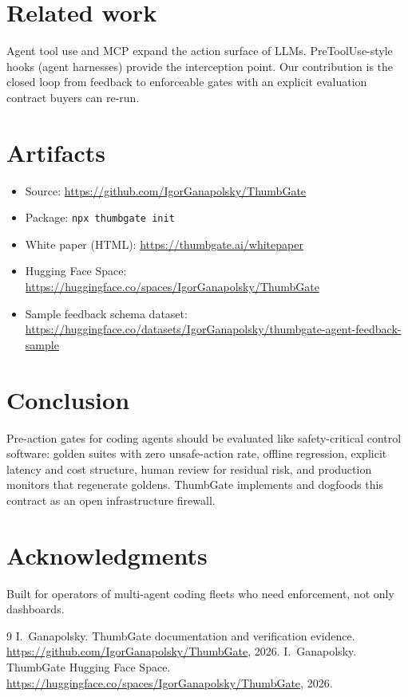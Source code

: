 \documentclass[11pt]{article}
\begin{document}
\section{Related work}
Agent tool use and MCP expand the action surface of LLMs. PreToolUse-style hooks (agent harnesses) provide the interception point. Our contribution is the closed loop from feedback to enforceable gates with an explicit evaluation contract buyers can re-run.

\section{Artifacts}
\begin{itemize}[leftmargin=*]
  \item Source: \url{https://github.com/IgorGanapolsky/ThumbGate}
  \item Package: \texttt{npx thumbgate init}
  \item White paper (HTML): \url{https://thumbgate.ai/whitepaper}
  \item Hugging Face Space: \url{https://huggingface.co/spaces/IgorGanapolsky/ThumbGate}
  \item Sample feedback schema dataset: \url{https://huggingface.co/datasets/IgorGanapolsky/thumbgate-agent-feedback-sample}
\end{itemize}

\section{Conclusion}
Pre-action gates for coding agents should be evaluated like safety-critical control software: golden suites with zero unsafe-action rate, offline regression, explicit latency and cost structure, human review for residual risk, and production monitors that regenerate goldens. ThumbGate implements and dogfoods this contract as an open infrastructure firewall.

\section*{Acknowledgments}
Built for operators of multi-agent coding fleets who need enforcement, not only dashboards.

\begin{thebibliography}{9}
I.~Ganapolsky.
\newblock ThumbGate documentation and verification evidence.
\newblock \url{https://github.com/IgorGanapolsky/ThumbGate}, 2026.
I.~Ganapolsky.
\newblock ThumbGate Hugging Face Space.
\newblock \url{https://huggingface.co/spaces/IgorGanapolsky/ThumbGate}, 2026.
\end{thebibliography}
\end{document}
